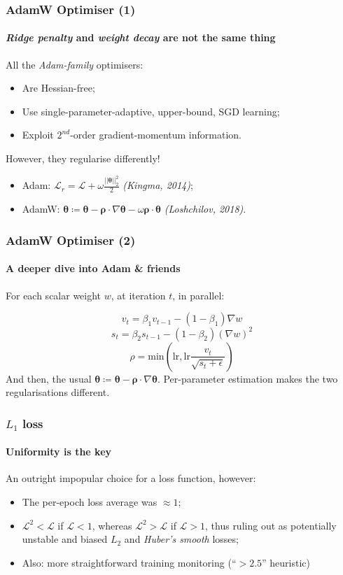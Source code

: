 \documentclass{beamer}
\begin{document}
{\begin{frame}
\end{frame}
\begin{frame}
	\frametitle{AdamW Optimiser (1)}
	\framesubtitle{\textit{Ridge penalty} and \textit{weight decay} are not the same thing}
	All the \textit{Adam-family} optimisers:
	\begin{itemize}
		\item{Are Hessian-free;}
		\item{Use single-parameter-adaptive, upper-bound, SGD learning;}
		\item{Exploit $2^{nd}$-order gradient-momentum information.}
	\end{itemize}
\hfill\break
However, they regularise differently!
	\begin{itemize}
	\item{Adam: $\mathcal{L}_r = \mathcal{L} + \omega \frac{||\boldsymbol{\theta}||_2^2}{2}$ \textit{(Kingma, 2014)};}
	\item{AdamW: $\boldsymbol{\theta} \coloneqq \boldsymbol{\theta} - \boldsymbol{\rho}\cdot \nabla \boldsymbol{\theta} - \omega \boldsymbol{\rho}\cdot \boldsymbol{\theta}$ \textit{(Loshchilov, 2018)}.}
	\end{itemize}
\end{frame}
\begin{frame}
	\frametitle{AdamW Optimiser (2)}
	\framesubtitle{A deeper dive into Adam \& friends}

	For each scalar weight $w$, at iteration $t$, in parallel:

	$$
	v_t = \beta_1 v_{t-1} - (1-\beta_1) \nabla w
	$$
	$$
	s_t = \beta_2 s_{t-1} - (1-\beta_2) (\nabla w)^2
	$$
	$$
	\rho = \text{min}\left({\text{lr}, \text{lr} \frac{v_t}{\sqrt{s_t + \epsilon}}}\right)
	$$
\hfill\break
	And then, the usual $\boldsymbol{\theta} \coloneqq \boldsymbol{\theta} - \boldsymbol{\rho}\cdot \nabla \boldsymbol{\theta}$.
\hfill\break
\hfill\break
Per-parameter estimation makes the two regularisations different.

\end{frame}

\begin{frame}
	\frametitle{$L_1$ loss}
	\framesubtitle{Uniformity is the key}
	An outright impopular choice for a loss function, however:
	\hfill\break
\begin{itemize}
	\item{The per-epoch loss average was $\approx 1$;}
	\item{$\mathcal{L}^2 < \mathcal{L}$ if $\mathcal{L} < 1$, whereas $\mathcal{L}^2 > \mathcal{L}$ if $\mathcal{L} > 1$, thus ruling out as potentially unstable and biased $L_2$ and \textit{Huber's smooth} losses;}
	\item{Also: more straightforward training monitoring (``$>2.5$'' heuristic)}
\end{itemize}
\end{frame}
}
\end{document}

